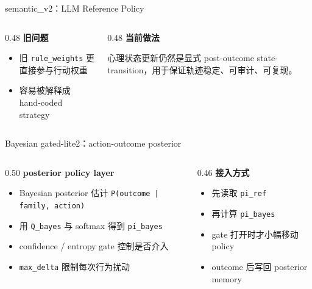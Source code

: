 \documentclass[aspectratio=169]{beamer}
\begin{document}
\begin{frame}[t]{semantic\_v2：LLM Reference Policy}
\small
\begin{columns}[T]
\begin{column}{0.48\textwidth}
\textbf{旧问题}
\begin{itemize}
    \item 旧 \texttt{rule\_weights} 更直接参与行动权重
    \item 容易被解释成 hand-coded strategy
\end{itemize}
\end{column}

\begin{column}{0.48\textwidth}
\textbf{当前做法}
\vspace{0.12cm}
\begin{minipage}{0.94\textwidth}
\justifying
心理状态更新仍然是显式 post-outcome state-transition，用于保证轨迹稳定、可审计、可复现。
\end{minipage}
\end{column}
\end{columns}

\end{frame}

\begin{frame}[t]{Bayesian gated-lite2：action-outcome posterior}
\small
\begin{columns}[T]
\begin{column}{0.50\textwidth}
\textbf{posterior policy layer}
\begin{itemize}
    \item Bayesian posterior 估计 \texttt{P(outcome | family, action)}
    \item 用 \texttt{Q\_bayes} 与 softmax 得到 \texttt{pi\_bayes}
    \item confidence / entropy gate 控制是否介入
    \item \texttt{max\_delta} 限制每次行为扰动
\end{itemize}
\end{column}

\begin{column}{0.46\textwidth}
\textbf{接入方式}
\begin{itemize}
    \item 先读取 \texttt{pi\_ref}
    \item 再计算 \texttt{pi\_bayes}
    \item gate 打开时才小幅移动 policy
    \item outcome 后写回 posterior memory
\end{itemize}
\end{column}
\end{columns}
\end{frame}
\end{document}
